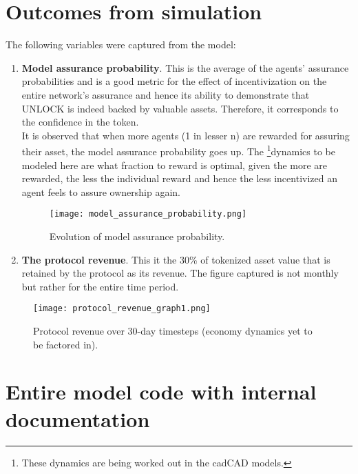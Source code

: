 \documentclass{article}
\begin{document}
\section{Outcomes from simulation}
The following variables were captured from the model:
\begin{enumerate}
    \item \textbf{Model assurance probability}. This is the average of the agents’ assurance probabilities and is a good metric for the effect of incentivization on the entire network’s assurance and hence its ability to demonstrate that UNLOCK is indeed backed by valuable assets. Therefore, it corresponds to the confidence in the token. \\
    It is observed that when more agents (1 in lesser n) are rewarded for assuring their asset, the model assurance probability goes up. The \footnote{These dynamics are being worked out in the cadCAD models.}dynamics to be modeled here are what fraction to reward is optimal, given the more are rewarded, the less the individual reward and hence the less incentivized an agent feels to assure ownership again.

    \begin{figure}[H]
    \centering
    \texttt{[image: model\_assurance\_probability.png]}
    \caption{Evolution of model assurance probability.}
    \label{fig:CPMM1}
    \end{figure}

    \item \textbf{The protocol revenue}. This it the 30\% of tokenized asset value that is retained by the protocol as its revenue. The figure captured is not monthly but rather for the entire time period.

\end{enumerate}

\begin{figure}[H]
    \centering
    \texttt{[image: protocol\_revenue\_graph1.png]}
    \label{fig:CPMM1}
    \caption{Protocol revenue over 30-day timesteps (economy dynamics yet to be factored in).}
\end{figure}

\section{Entire model code with internal documentation}
\end{document}
